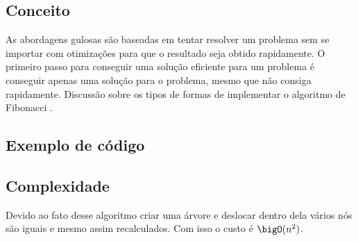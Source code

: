 \subsection{Conceito}

As abordagens gulosas são baseadas em tentar resolver um problema sem 
se importar com otimizações para que o resultado seja obtido rapidamente.
O primeiro passo para conseguir uma solução eficiente para um problema é
conseguir apenas uma solução para o problema, mesmo que não consiga 
rapidamente. Discussão sobre os tipos de formas de implementar o algoritmo
de Fibonacci \cite{GreedyProgramming}.

\subsection{Exemplo de código}


\subsection{Complexidade}
Devido ao fato desse algoritmo criar uma árvore e deslocar dentro
dela vários nós são iguais e mesmo assim recalculados. Com isso
o custo é $\bigO(n^2)$.